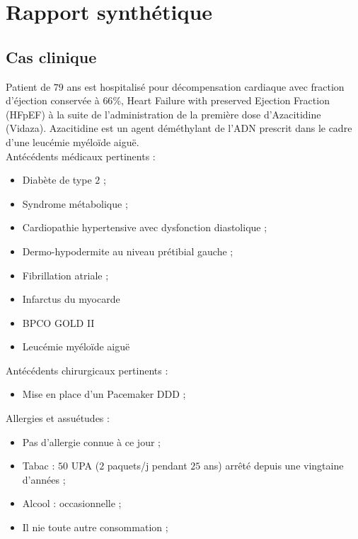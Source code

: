 \section{Rapport synthétique}

\subsection{Cas clinique}
Patient de $79$ ans est hospitalisé pour décompensation cardiaque avec fraction d’éjection conservée à $66$\%, Heart Failure with preserved Ejection Fraction (HFpEF) à la suite de l’administration de la première dose d’Azacitidine (Vidaza). Azacitidine est un agent déméthylant de l’ADN prescrit dans le cadre d’une leucémie myéloïde aiguë.\\
Antécédents médicaux pertinents :

\begin{itemize}[label=\textbullet]
    \item Diabète de type $2$ ;
    \item Syndrome métabolique ;
    \item Cardiopathie hypertensive avec dysfonction diastolique  ;
    \item Dermo-hypodermite au niveau prétibial gauche ;
    \item Fibrillation atriale ;
    \item Infarctus du myocarde 
    \item BPCO GOLD II
    \item Leucémie myéloïde aiguë
    \end{itemize}

Antécédents chirurgicaux pertinents :

\begin{itemize}[label=\textbullet]
    \item Mise en place d’un Pacemaker DDD ;
    \end{itemize}

Allergies et assuétudes :

\begin{itemize}[label=\textbullet]
    \item Pas d’allergie connue à ce jour ;
    \item Tabac : $50$ UPA ($2$ paquets/j pendant $25$ ans) arrêté depuis une vingtaine d’années ;
    \item Alcool : occasionnelle ;
    \item Il nie toute autre consommation ;
    \end{itemize}



